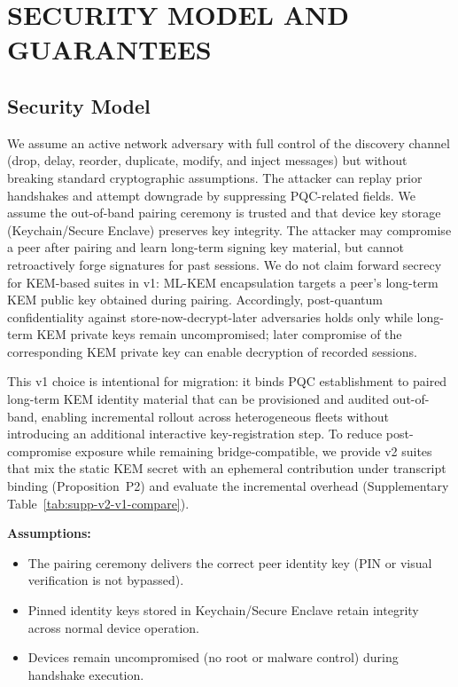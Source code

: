 \documentclass[10pt,journal,compsoc]{IEEEtran}
\providecommand{\tightlist}{%
  \setlength{\itemsep}{0pt}\setlength{\parskip}{0pt}}
\begin{document}
\section{SECURITY MODEL AND
GUARANTEES}\label{sec:security-model}

\subsection{Security Model}\label{a.-security-model}

We assume an active network adversary with full control of the discovery
channel (drop, delay, reorder, duplicate, modify, and inject messages)
but without breaking standard cryptographic assumptions. The attacker
can replay prior handshakes and attempt downgrade by suppressing
PQC-related fields. We assume the out-of-band pairing ceremony is
trusted and that device key storage (Keychain/Secure Enclave) preserves
key integrity. The attacker may compromise a peer after pairing and
learn long-term signing key material, but cannot retroactively forge
signatures for past sessions. We do not claim forward secrecy for
KEM-based suites in v1: ML-KEM encapsulation targets a peer's long-term
KEM public key obtained during pairing. Accordingly, post-quantum
confidentiality against store-now-decrypt-later adversaries holds only
while long-term KEM private keys remain uncompromised; later compromise
of the corresponding KEM private key can enable decryption of recorded
sessions.

This v1 choice is intentional for migration: it binds PQC establishment
to paired long-term KEM identity material that can be provisioned and
audited out-of-band, enabling incremental rollout across heterogeneous
fleets without introducing an additional interactive key-registration
step. To reduce post-compromise exposure while remaining
bridge-compatible, we provide v2 suites that mix the static KEM secret
with an ephemeral contribution under transcript binding
(Proposition~P2) and evaluate the incremental overhead (Supplementary
Table~\ref{tab:supp-v2-v1-compare}).

\textbf{Assumptions:}
\begin{itemize}\tightlist
\item
  The pairing ceremony delivers the correct peer identity key (PIN or
  visual verification is not bypassed).
\item
  Pinned identity keys stored in Keychain/Secure Enclave retain integrity
  across normal device operation.
\item
  Devices remain uncompromised (no root or malware control) during
  handshake execution.
\end{itemize}
\end{document}
